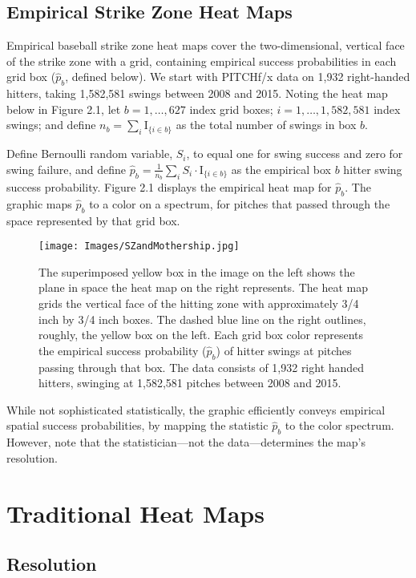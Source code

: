 \subsection{Empirical Strike Zone Heat Maps}

Empirical baseball strike zone heat maps cover the two-dimensional, vertical face of the strike zone with a grid, containing empirical success probabilities  in each grid box ($\hat{p}_{b}$, defined below).  We start with PITCHf/x\textsuperscript{\textregistered} data on 1,932 right-handed hitters, taking 1,582,581 swings between 2008 and 2015.  Noting the heat map below in Figure 2.1, let $b = 1, \dots, 627$ index grid boxes; $i = 1, \dots, 1,582,581$ index swings; and define $n_{b} = \displaystyle\sum_{i} \text{I}_{\{i \in b \}}$ as the total number of swings in box $b$.

Define Bernoulli random variable, $S_{i}$, to equal one for swing success and zero for swing failure, and define $\hat{p}_{b} = \frac{1}{n_{b}} \displaystyle\sum_{i} S_{i} \cdot \text{I}_{\{i \in b \}}$ as the empirical box $b$ hitter swing success probability. Figure 2.1 displays the empirical heat map for $\hat{p}_{b}$. The graphic maps $\hat{p}_{b}$ to a color on a spectrum, for pitches that passed through the space represented by that grid box.
  \begin{figure}[H]
	\centering
	\texttt{[image: Images/SZandMothership.jpg]} 
  \caption{The superimposed yellow box in the image on the left shows the plane in space the heat map on the right represents. The heat map grids the vertical face of the hitting zone with approximately 3/4 inch by 3/4 inch boxes. The dashed blue line on the right outlines, roughly, the yellow box on the left. Each grid box color represents the empirical success probability ($\hat{p}_{b}$) of hitter swings at pitches passing through that box.  The data consists of 1,932 right handed hitters, swinging at 1,582,581 pitches between 2008 and 2015.}
	\end{figure} 
While not sophisticated statistically, the graphic efficiently conveys empirical spatial success probabilities, by mapping the statistic $\hat{p}_{b}$ to the color spectrum. However, note that the statistician---not the data---determines the map's resolution.

\section{Traditional Heat Maps}

\subsection{Resolution} %

